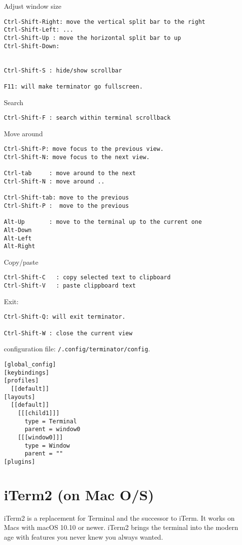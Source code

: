 Adjust window size
\begin{verbatim}
Ctrl-Shift-Right: move the vertical split bar to the right
Ctrl-Shift-Left: ...
Ctrl-Shift-Up : move the horizontal split bar to up
Ctrl-Shift-Down: 


Ctrl-Shift-S : hide/show scrollbar

F11: will make terminator go fullscreen.

\end{verbatim}

Search
\begin{verbatim}
Ctrl-Shift-F : search within terminal scrollback

\end{verbatim}

Move around
\begin{verbatim}
Ctrl-Shift-P: move focus to the previous view.
Ctrl-Shift-N: move focus to the next view.

Ctrl-tab     : move around to the next
Ctrl-Shift-N : move around ..

Ctrl-Shift-tab: move to the previous
Ctrl-Shift-P :  move to the previous

Alt-Up       : move to the terminal up to the current one
Alt-Down  
Alt-Left
Alt-Right
\end{verbatim}

Copy/paste
\begin{verbatim}
Ctrl-Shift-C   : copy selected text to clipboard
Ctrl-Shift-V   : paste clippboard text
\end{verbatim}


Exit:
\begin{verbatim}
Ctrl-Shift-Q: will exit terminator.

Ctrl-Shift-W : close the current view
\end{verbatim}

configuration file:
\verb!/.config/terminator/config!.
\begin{verbatim}
[global_config]
[keybindings]
[profiles]
  [[default]]
[layouts]
  [[default]]
    [[[child1]]]
      type = Terminal
      parent = window0
    [[[window0]]]
      type = Window
      parent = ""
[plugins]
\end{verbatim}


\section{iTerm2 (on Mac O/S)}
\label{sec:iTerm2}

iTerm2 is a replacement for Terminal and the successor to iTerm. It works on
Macs with macOS 10.10 or newer. iTerm2 brings the terminal into the modern age
with features you never knew you always wanted.

